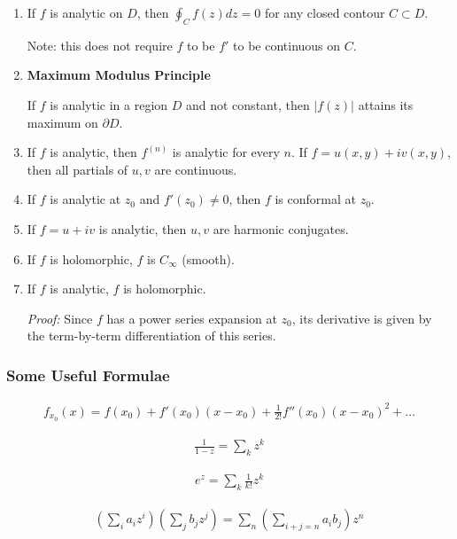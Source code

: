 \begin{enumerate}
\def\labelenumi{\arabic{enumi}.}
\item
  If \(f\) is analytic on \(D\), then \(\oint_C f(z) dz = 0\) for any
  closed contour \(C \subset D\).

  Note: this does not require \(f\) to be \(f'\) to be continuous on
  \(C\).
\item
  \textbf{Maximum Modulus Principle}

  If \(f\) is analytic in a region \(D\) and not constant, then
  \(|f(z)|\) attains its maximum on \(\partial D\).
\item
  If \(f\) is analytic, then \(f^{(n)}\) is analytic for every \(n\). If
  \(f = u(x,y) + iv(x,y)\), then all partials of \(u,v\) are continuous.
\item
  If \(f\) is analytic at \(z_0\) and \(f'(z_0) \neq 0\), then \(f\) is
  conformal at \(z_0\).
\item
  If \(f = u+iv\) is analytic, then \(u,v\) are harmonic conjugates.
\item
  If \(f\) is holomorphic, \(f\) is \(C_\infty\) (smooth).
\item
  If \(f\) is analytic, \(f\) is holomorphic.

  \emph{Proof:} Since \(f\) has a power series expansion at \(z_0\), its
  derivative is given by the term-by-term differentiation of this
  series.
\end{enumerate}

\hypertarget{some-useful-formulae}{%
\subsubsection{Some Useful Formulae}\label{some-useful-formulae}}

\begin{align*}
  f_{x_0}(x) = f(x_0) + f'(x_0)(x-x_0) + \frac{1}{2!}f''(x_0)(x-x_0)^2 + \ldots
  \end{align*}

\begin{align*}
\frac{1}{1-z} = \sum_k z^k
\end{align*}

\begin{align*}
  e^z = \sum_k \frac{1}{k!} z^k
  \end{align*}

\begin{align*}
    \left(\sum_i a_i z^i \right) \left( \sum_j b_j z^j\right) = \sum_n \left( \sum\limits_{i+j=n}a_ib_j \right) z^n
    \end{align*}

